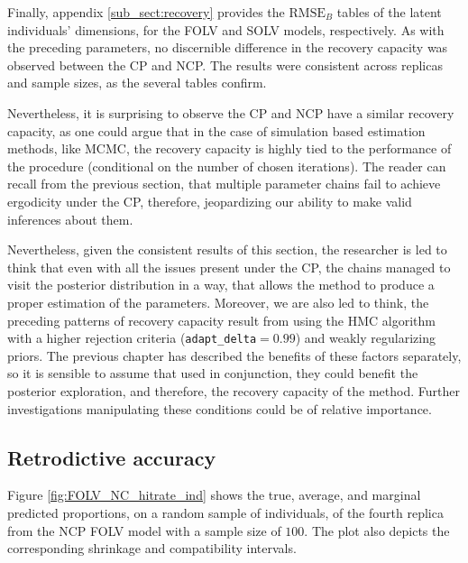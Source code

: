 Finally, appendix \ref{sub_sect:recovery} provides the $\text{RMSE}_{B}$ tables of the latent individuals' dimensions, for the FOLV and SOLV models, respectively. As with the preceding parameters, no discernible difference in the recovery capacity was observed between the CP and NCP. The results were consistent across replicas and sample sizes, as the several tables confirm. 

Nevertheless, it is surprising to observe the CP and NCP have a similar recovery capacity, as one could argue that in the case of simulation based estimation methods, like MCMC, the recovery capacity is highly tied to the performance of the procedure (conditional on the number of chosen iterations). The reader can recall from the previous section, that multiple parameter chains fail to achieve ergodicity under the CP, therefore, jeopardizing our ability to make valid inferences about them. 

Nevertheless, given the consistent results of this section, the researcher is led to think that even with all the issues present under the CP, the chains managed to visit the posterior distribution in a way, that allows the method to produce a proper estimation of the parameters. Moreover, we are also led to think, the preceding patterns of recovery capacity result from using the HMC algorithm with a higher rejection criteria (\texttt{adapt\_delta}$=0.99$) and weakly regularizing priors. The previous chapter has described the benefits of these factors separately, so it is sensible to assume that used in conjunction, they could benefit the posterior exploration, and therefore, the recovery capacity of the method. Further investigations manipulating these conditions could be of relative importance.



\subsection{Retrodictive accuracy}

Figure \ref{fig:FOLV_NC_hitrate_ind} shows the true, average, and marginal predicted proportions, on a random sample of individuals, of the fourth replica from the NCP FOLV model with a sample size of $100$. The plot also depicts the corresponding shrinkage and compatibility intervals. 

